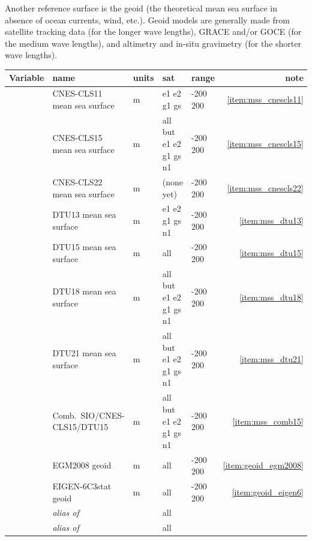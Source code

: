 \documentclass[a4paper,11pt,openany,natbib,nomargin]{thesis}
\newcommand\alias[1]{\emph{alias of} \var{#1}}
\newenvironment{vartable}{
\begin{table}[ht]
\small
\begin{tabular}{lllllr}
\hline\hline
Variable & name & units & sat & range & note \\
\hline\hline
}{
\hline
\end{tabular}
\end{table}
}
\begin{document}
Another reference surface is the geoid (the theoretical mean sea surface in absence of ocean currents, wind, etc.). Geoid models are generally made from satellite tracking data (for the longer wave lengths), GRACE and/or GOCE (for the medium wave lengths), and altimetry and in-situ gravimetry (for the shorter wave lengths).

\begin{vartable}
\var{mss_cnescls11} & CNES-CLS11 mean sea surface & m & e1 e2 g1 gs & -200 200 & \ref{item:mss_cnescls11} \\
\var{mss_cnescls15} & CNES-CLS15 mean sea surface & m & all but e1 e2 g1 gs n1 & -200 200 & \ref{item:mss_cnescls15} \\
\var{mss_cnescls22} & CNES-CLS22 mean sea surface & m & (none yet) & -200 200 & \ref{item:mss_cnescls22} \\
\var{mss_dtu13} & DTU13 mean sea surface & m & e1 e2 g1 gs n1 & -200 200 & \ref{item:mss_dtu13} \\
\var{mss_dtu15} & DTU15 mean sea surface & m & all & -200 200 & \ref{item:mss_dtu15} \\
\var{mss_dtu18} & DTU18 mean sea surface & m & all but e1 e2 g1 gs n1 & -200 200 & \ref{item:mss_dtu18} \\
\var{mss_dtu21} & DTU21 mean sea surface & m & all but e1 e2 g1 gs n1 & -200 200 & \ref{item:mss_dtu21} \\
\var{mss_comb15} & Comb.\ SIO/CNES-CLS15/DTU15 & m & all but e1 e2 g1 gs n1 & -200 200 & \ref{item:mss_comb15} \\
\var{geoid_egm2008} & EGM2008 geoid & m & all & -200 200 & \ref{item:geoid_egm2008} \\
\var{geoid_eigen6} & EIGEN-6C3stat geoid & m & all & -200 200 & \ref{item:geoid_eigen6} \\
\hline
\var{mss} & \alias{mss_dtu15} && all && \\
\var{geoid} & \alias{geoid_egm2008} && all && \\
\end{vartable}
\end{document}
